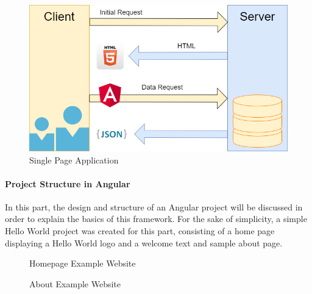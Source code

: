\begin{figure}[H]
    \centering
    \includegraphics[width=1.0\textwidth]{./images/single_page_app}
    \caption{Single Page Application}
    \label{fig:singpageapp}
\end{figure}

\newpage
\paragraph{Project Structure in Angular}
In this part, the design and structure of an Angular project will be discussed in order to explain the basics of this
framework.
For the sake of simplicity, a simple Hello World project was created for this part, consisting of a home page displaying
a Hello World logo and a welcome text and sample about page.

\begin{figure}[H]
    \centering
    \caption{Homepage Example Website}
    \label{fig:examplehomepage}
\end{figure}

\begin{figure}[H]
    \centering
    \caption{About Example Website}
    \label{fig:figure41}
\end{figure}


